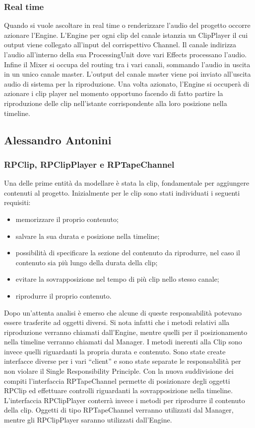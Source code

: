 \documentclass[a4paper,12pt]{report}
\begin{document}
\subsubsection{Real time}
Quando si vuole ascoltare in real time o renderizzare l’audio del progetto occorre azionare l’Engine. 
L’Engine per ogni clip del canale istanzia un ClipPlayer il cui output viene collegato all’input del corrispettivo Channel. Il canale indirizza l’audio all’interno della sua ProcessingUnit dove vari Effects processano l’audio. Infine il Mixer si occupa del routing tra i vari canali, sommando l’audio in uscita in un unico canale master. L’output del canale master viene poi inviato all’uscita audio di sistema per la riproduzione.
Una volta azionato, l’Engine si occuperà di azionare i clip player nel momento opportuno facendo di fatto partire la riproduzione delle clip nell’istante corrispondente alla loro posizione nella timeline.

\subsection{Alessandro Antonini}

\subsubsection{RPClip, RPClipPlayer e RPTapeChannel}
Una delle prime entità da modellare è stata la clip, fondamentale per aggiungere contenuti al progetto.
Inizialmente per le clip sono stati individuati i seguenti requisiti: 
\begin{itemize}
    \item memorizzare il proprio contenuto;
    \item salvare la sua durata e posizione nella timeline;
    \item possibilità di specificare la sezione del contenuto da riprodurre, nel caso il contenuto sia più lungo della durata della clip;
    \item evitare la sovrapposizione nel tempo di più clip nello stesso canale;
    \item riprodurre il proprio contenuto.
\end{itemize}

Dopo un’attenta analisi è emerso che alcune di queste responsabilità potevano essere trasferite ad oggetti diversi. 
Si nota infatti che i metodi relativi alla riproduzione verranno chiamati dall’Engine, mentre quelli per il posizionamento nella timeline verranno chiamati dal Manager.
I metodi inerenti alla Clip sono invece quelli riguardanti la propria durata e contenuto.
Sono state create interfacce diverse per i vari “client” e sono state separate le responsabilità per non violare il Single Responsibility Principle.
Con la nuova suddivisione dei compiti l’interfaccia RPTapeChannel permette di posizionare degli oggetti RPClip ed effettuare controlli riguardanti la sovrapposizione nella timeline.
L’interfaccia RPClipPlayer conterrà invece i metodi per riprodurre il contenuto della clip.
Oggetti di tipo RPTapeChannel verranno utilizzati dal Manager, mentre gli RPClipPlayer saranno utilizzati dall’Engine.
\end{document}
